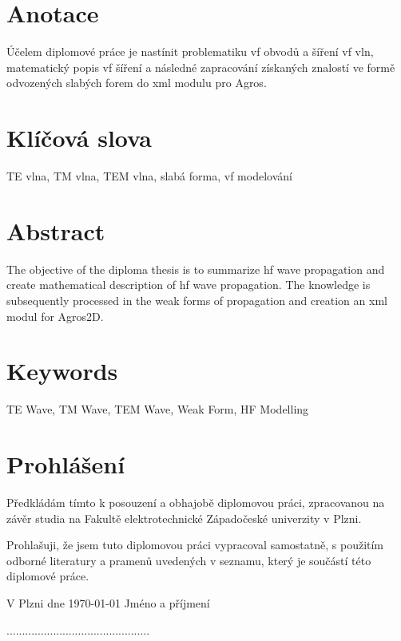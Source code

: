 \documentclass[12pt,a4paper,oneside]{article}
\numberwithin{equation}{section} %
\numberwithin{figure}{section} %
\numberwithin{table}{section} %
\begin{document}
\section*{Anotace}
Účelem diplomové práce je nastínit problematiku vf obvodů a šíření vf vln, 				matematický popis vf šíření a následné zapracování získaných znalostí ve formě 			odvozených slabých forem do xml modulu pro Agros.
\vspace{100mm}\\

\section*{Klíčová slova}
TE vlna, TM vlna, TEM vlna, slabá forma, vf modelování
\newpage


\section*{Abstract}
The objective of the diploma thesis is to summarize hf wave propagation and create 		mathematical description of hf wave propagation. The knowledge is subsequently 			processed in the weak forms of propagation and creation an xml modul for Agros2D.
\vspace{100mm}\\

\section*{Keywords}
TE Wave, TM Wave, TEM Wave, Weak Form, HF Modelling
\newpage


\vspace*{50mm}
\section*{Prohlášení}
Předkládám tímto k posouzení a obhajobě diplomovou práci, zpracovanou na závěr 			studia na Fakultě elektrotechnické Západočeské univerzity v Plzni.

Prohlašuji, že jsem tuto diplomovou práci vypracoval samostatně, s použitím odborné 	literatury a pramenů uvedených v seznamu, který je součástí této diplomové práce.
\vspace{\fill}
\begin{flushleft}
V Plzni dne \today
\hspace{\fill}
Jméno a příjmení~~~~~~~~\vspace{3mm}
\end{flushleft}
\begin{flushright}
..............................................
\end{flushright}
\newpage
\end{document}
